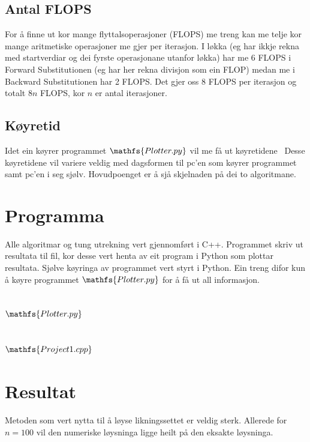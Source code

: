 \documentclass[11pt, a4paper]{article}
\begin{document}
  \subsection{Antal FLOPS}
    For å finne ut kor mange flyttalsoperasjoner (FLOPS) me treng kan me telje kor mange 
    aritmetiske operasjoner me gjer per iterasjon. I løkka (eg har ikkje rekna med startverdiar og 
    dei fyrste operasjonane utanfor løkka) har me 6 FLOPS i Forward Substitutionen (eg har her 
    rekna divisjon som ein FLOP) medan me i Backward Substitutionen har 2 FLOPS. Det gjer oss 8 FLOPS 
    per iterasjon og totalt $8n$ FLOPS, kor $n$ er antal iterasjoner.


  \subsection{Køyretid}
    Idet ein køyrer programmet $\mathfs{Plotter.py}$ vil me få ut køyretidene
     \
    Desse køyretidene vil variere veldig med dagsformen til pc'en som køyrer programmet samt
    pc'en i seg sjølv. Hovudpoenget er å sjå skjelnaden på dei to algoritmane.

\section{Programma}
  Alle algoritmar og tung utrekning vert gjennomført i C++. Programmet skriv ut resultata til fil,
  kor desse vert henta av eit program i Python som plottar resultata. Sjølve køyringa av programmet 
  vert styrt i Python. Ein treng difor kun å køyre programmet $\mathfs{Plotter.py}$ for å få ut all
  informasjon. 

  \subsection{$\mathfs{Plotter.py}$}
   
  \subsection{$\mathfs{Project1.cpp}$}

    
\section{Resultat}
  Metoden som vert nytta til å løyse likningssettet er veldig sterk. Allerede for $n = 100$ vil 
  den numeriske løysninga ligge heilt på den eksakte løysninga. 
\end{document}
